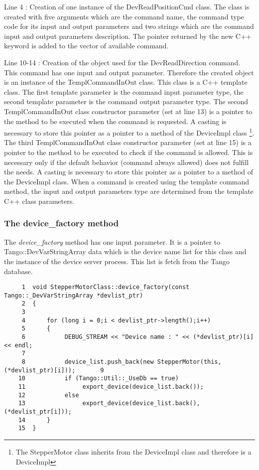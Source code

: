 Line 4 : Creation of one instance of the DevReadPositionCmd class.
The class is created with five arguments which are the command name,
the command type code for its input and output parameters and two
strings which are the command input and output parameters description.
The pointer returned by the new C++ keyword is added to the vector
of available command.

Line 10-14 : Creation of the object used for the DevReadDirection
command. This command has one input and output parameter. Therefore
the created object is an instance of the TemplCommandInOut class.
This class is a C++ template class. The first template parameter is
the command input parameter type, the second template parameter is
the command output parameter type. The second TemplCommandInOut
class constructor parameter (set at line 13) is a pointer to the method
to be executed when the command is requested. A casting is necessary
to store this pointer as a pointer to a method of the DeviceImpl class%
\footnote{The StepperMotor class inherits from the DeviceImpl class and therefore
is a DeviceImpl%
}. The third TemplCommandInOut class constructor parameter (set at
line 15) is a pointer to the method to be executed to check if the
command is allowed. This is necessary only if the default behavior
(command always allowed) does not fulfill the needs. A casting is
necessary to store this pointer as a pointer to a method of the DeviceImpl
class. When a command is created using the template command method,
the input and output parameters type are determined from the template
C++ class parameters.


\subsubsection{The device\_factory method}

The \emph{device\_factory} method has one input
parameter. It is a pointer to Tango::DevVarStringArray data which
is the device name list for this class and the instance of the device
server process. This list is fetch from the Tango database.


\begin{verbatim}
     1  void StepperMotorClass::device_factory(const Tango::_DevVarStringArray *devlist_ptr)
     2  {
     3          
     4      for (long i = 0;i < devlist_ptr->length();i++)
     5      {
     6           DEBUG_STREAM << "Device name : " << (*devlist_ptr)[i] << endl;
     7                                                  
     8           device_list.push_back(new StepperMotor(this,(*devlist_ptr)[i]));       9  
    10           if (Tango::Util::_UseDb == true)
    11                export_device(device_list.back());
    12           else
    13                export_device(device_list.back(),(*devlist_ptr[i]));
    14      }
    15  }
\end{verbatim}


